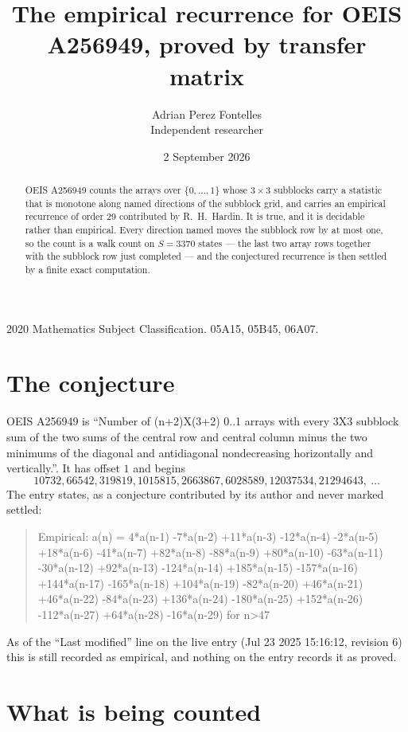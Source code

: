 \documentclass[11pt,a4paper]{article}
\title{The empirical recurrence for OEIS A256949, proved by transfer matrix}
\author{Adrian Perez Fontelles\\ \small Independent researcher}
\date{2 September 2026}
\theoremstyle{plain}
\theoremstyle{definition}
\begin{document}
\maketitle

\begin{abstract}
OEIS A256949 counts the arrays over $\{0,\dots,1\}$ whose $3\times3$ subblocks carry a
statistic that is monotone along named directions of the subblock grid, and carries an
empirical recurrence of order $29$ contributed by R.~H.~Hardin. It is true, and it is
decidable rather than empirical. Every direction named moves the subblock row by at most one,
so the count is a walk count on $S=3370$ states --- the last two array rows together with the
subblock row just completed --- and the conjectured recurrence is then settled by a finite
exact computation.
\end{abstract}

\noindent\small 2020 Mathematics Subject Classification. 05A15, 05B45, 06A07.\normalsize

\section{The conjecture}

OEIS A256949 is ``Number of (n+2)X(3+2) 0..1 arrays with every 3X3 subblock sum of the two sums of the central row and central column minus the two minimums of the diagonal and antidiagonal nondecreasing horizontally and vertically.''. It has offset $1$ and begins
\[
10732, 66542, 319819, 1015815, 2663867, 6028589, 12037534, 21294643,\ \dots
\]
The entry states, as a conjecture contributed by its author and never marked settled:
\begin{quote}
Empirical: a(n) = 4*a(n-1) -7*a(n-2) +11*a(n-3) -12*a(n-4) -2*a(n-5) +18*a(n-6) -41*a(n-7) +82*a(n-8) -88*a(n-9) +80*a(n-10) -63*a(n-11) -30*a(n-12) +92*a(n-13) -124*a(n-14) +185*a(n-15) -157*a(n-16) +144*a(n-17) -165*a(n-18) +104*a(n-19) -82*a(n-20) +46*a(n-21) +46*a(n-22) -84*a(n-23) +136*a(n-24) -180*a(n-25) +152*a(n-26) -112*a(n-27) +64*a(n-28) -16*a(n-29) for n>47
\end{quote}
As of the ``Last modified'' line on the live entry (Jul 23 2025 15:16:12, revision 6) this is still
recorded as empirical, and nothing on the entry records it as proved.

\section{What is being counted}
\end{document}
